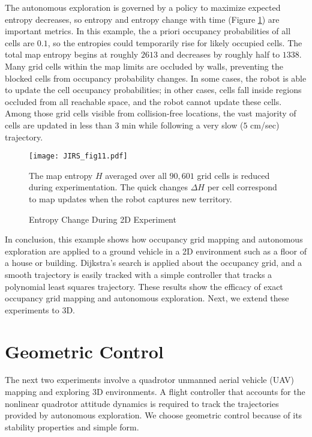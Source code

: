 The autonomous exploration is governed by a policy to maximize expected entropy decreases, so entropy and entropy change with time (Figure \ref{fig:ExperimentH}) are important metrics. In this example, the a priori occupancy probabilities of all cells are $0.1$, so the entropies could temporarily rise for likely occupied cells. The total map entropy begins at roughly $2613$ and decreases by roughly half to $1338$. Many grid cells within the map limits are occluded by walls, preventing the blocked cells from occupancy probability changes. In some cases, the robot is able to update the cell occupancy probabilities; in other cases, cells fall inside regions occluded from all reachable space, and the robot cannot update these cells. Among those grid cells visible from collision-free locations, the vast majority of cells are updated in less than $3$ min while following a very slow ($5$ cm/sec) trajectory.

\begin{figure}
	\centering
	\texttt{[image: JIRS\_fig11.pdf]}
	\caption{Entropy Change During 2D Experiment}
	\medskip
	\small
	The map entropy $H$ averaged over all $90,601$ grid cells is reduced during experimentation. The quick changes $\Delta H$ per cell correspond to map updates when the robot captures new territory.
	\label{fig:ExperimentH}
\end{figure}

In conclusion, this example shows how occupancy grid mapping and autonomous exploration are applied to a ground vehicle in a 2D environment such as a floor of a house or building. Dijkstra's search is applied about the occupancy grid, and a smooth trajectory is easily tracked with a simple controller that tracks a polynomial least squares trajectory. These results show the efficacy of exact occupancy grid mapping and autonomous exploration. Next, we extend these experiments to 3D.


\section{Geometric Control}
\label{sec:GeometricControl}

The next two experiments involve a quadrotor unmanned aerial vehicle (UAV) mapping and exploring 3D environments. A flight controller that accounts for the nonlinear quadrotor attitude dynamics is required to track the trajectories provided by autonomous exploration. We choose geometric control because of its stability properties and simple form.

